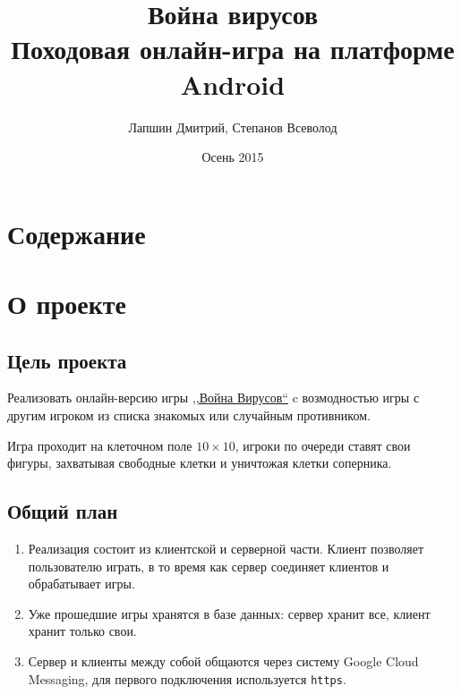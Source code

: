 \documentclass{beamer}
\title[Война вирусов]{Война вирусов\\Походовая онлайн-игра на платформе Android}
\author{Лапшин Дмитрий, Степанов Всеволод}
\institute{СПб АУ РАН}
\date{Осень 2015}
\makeatletter
\newcommand*{\currentname}{\@currentlabelname}
\def\t{\texttt}
\newcommand{\cimg}[2]{%
	\begin{center}%
		\ifthenelse{\equal{#2}{}}{%
			\texttt{[image: \#1]}
		}{%
			\texttt{[image: \#1]}
		}%
	\end{center}%
}
\makeatother
\begin{document}
\begin{frame}
	\titlepage
\end{frame}

\section{Содержание}

\begin{frame}[t]{\currentname}
	\tableofcontents
\end{frame}

\section{О проекте}

\subsection{Цель проекта}

\begin{frame}[t]{\currentname}
	Реализовать онлайн-версию игры
	\href{https://ru.wikipedia.org/wiki/\%D0\%92\%D0\%BE\%D0\%B9\%D0\%BD\%D0\%B0\_\%D0\%B2\%D0\%B8\%D1\%80\%D1\%83\%D1\%81\%D0\%BE\%D0\%B2}{,,Война Вирусов``}
	c возмодностью игры с другим игроком из списка знакомых или случайным противником.

	Игра проходит на клеточном поле $10 \times 10$, игроки по очереди ставят свои фигуры, захватывая свободные клетки и уничтожая клетки соперника.
	\cimg{01.png}{0.2}
\end{frame}

\subsection{Общий план}

\begin{frame}[t]{\currentname}
	\begin{enumerate}
	\item
		Реализация состоит из клиентской и серверной части.
		Клиент позволяет пользователю играть, в то время как сервер соединяет клиентов и обрабатывает игры.
	\pause
	\item
		Уже прошедшие игры хранятся в базе данных: сервер хранит все, клиент хранит только свои.
	\pause
	\item
		Сервер и клиенты между собой общаются через систему Google Cloud Messaging, для первого подключения используется \t{https}.
	\end{enumerate}
\end{frame}
\end{document}
